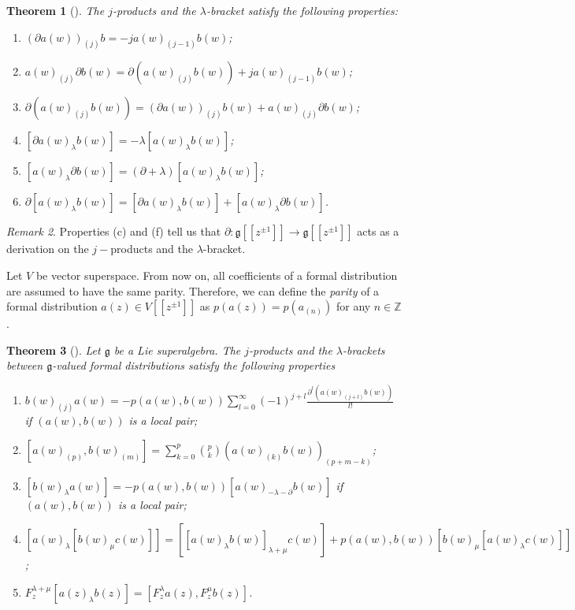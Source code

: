 \documentclass[a4paper, 12pt, reqno]{amsart}
\newtheorem{theorem}{Theorem}[section]
\theoremstyle{remark}
\newtheorem{remark}[theorem]{Remark}
\numberwithin{equation}{subsection}
\begin{document}
\begin{theorem}[{\cite[\S2.3]{nozaradan_introduction_2008}}]
  \label{thr:8}
  The $j$-products and the $\lambda$-bracket satisfy the following properties:
  \begin{enumerate}
  \item $(\partial a(w))_{(j)}b = -ja(w)_{(j - 1)}b(w)$;
  \item $a(w)_{(j)}\partial b(w) = \partial(a(w)_{(j)}b(w)) + ja(w)_{(j - 1)}b(w)$;
  \item $\partial(a(w)_{(j)}b(w))=(\partial a(w))_{(j)}b(w)+a(w)_{(j)}\partial b(w)$;
  \item $[\partial a(w)_{\lambda}b(w)] = -\lambda [a(w)_{\lambda}b(w)]$;
  \item $[a(w)_{\lambda}\partial b(w)] = (\partial + \lambda)[a(w)_{\lambda}b(w)]$;
  \item $\partial[a(w)_\lambda b(w)]=[\partial a(w)_\lambda b(w)]+[a(w)_\lambda \partial b(w)]$.
  \end{enumerate}
\end{theorem}
\begin{remark}
  \label{rmk:3}
  Properties (c) and (f) tell us that $\partial: \mathfrak{g}[[z^{\pm 1}]] \to \mathfrak{g}[[z^{\pm 1}]]$ acts as a derivation on the $j-$products and the $\lambda$-bracket.
\end{remark}

Let $V$ be vector superspace.
From now on, all coefficients of a formal distribution are assumed to have the same parity.
Therefore, we can define the \emph{parity} of a formal distribution $a(z) \in V[[z^{\pm 1}]]$ as $p(a(z)) = p(a_{(n)})$ for any $n \in \mathbb{Z}$.

\begin{theorem}[{\cite[\S2.3]{nozaradan_introduction_2008}}]
  \label{thr:9}
  Let $\mathfrak{g}$ be a Lie superalgebra.
  The $j$-products and the $\lambda$-brackets between $\mathfrak{g}$-valued formal distributions satisfy the following properties
  \begin{enumerate}
  \item $b(w)_{(j)}a(w) = -p(a(w), b(w))\sum_{l = 0}^{\infty}(-1)^{j + l}\frac{\partial^l(a(w)_{(j + l)}b(w))}{l!}$ if $(a(w), b(w))$ is a local pair;
  \item $[a(w)_{(p)}, b(w)_{(m)}] = \sum_{k = 0}^p\binom{p}{k}(a(w)_{(k)}b(w))_{(p + m - k)}$;
  \item $[b(w)_{\lambda}a(w)] = -p(a(w), b(w))[a(w)_{-\lambda - \partial}b(w)]$ if $(a(w), b(w))$ is a local pair;
  \item $[a(w)_{\lambda}[b(w)_{\mu}c(w)]] = [[a(w)_{\lambda}b(w)]_{\lambda + \mu}c(w)] + p(a(w), b(w))[b(w)_{\mu}[a(w)_{\lambda}c(w)]]$;
  \item $F^{\lambda + \mu}_z[a(z)_{\lambda}b(z)] = [F^{\lambda}_za(z), F^{\mu}_zb(z)]$.
  \end{enumerate}
\end{theorem}
\end{document}
